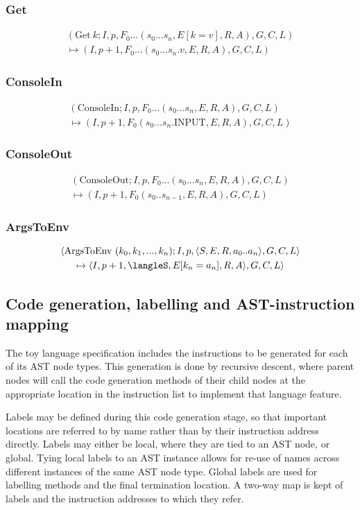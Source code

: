 \subsubsection{Get}
\begin{multline}
(\text{Get}\ k; I, p, F_0...(s_0...s_n, E[k=v], R, A), G, C, L) \\ \mapsto (I, p+1, F_0...(s_0...s_n.v, E, R, A), G, C, L)
\end{multline}
\subsubsection{ConsoleIn}
\begin{multline}
(\text{ConsoleIn}; I, p, F_0...(s_0...s_n, E, R, A), G, C, L) \\ \mapsto (I, p+1, F_0(s_0...s_n.\text{INPUT}, E, R, A), G, C, L)
\end{multline}
\subsubsection{ConsoleOut}
\begin{multline}
(\text{ConsoleOut}; I, p, F_0...(s_0...s_n, E, R, A), G, C, L) \\ \mapsto (I, p+1, F_0(s_0..s_{n-1}, E, R, A), G, C, L)
\end{multline}
\subsubsection{ArgsToEnv}
\begin{multline}
\langle \text{ArgsToEnv}\ (k_0, k_1, ..., k_n); I, p, \langle S, E, R, a_0..a_n \rangle, G, C, L \rangle \\ \mapsto \langle I, p+1, \langleS, E[k_n = a_n], R, A\rangle, G, C, L \rangle
\end{multline}
\subsection{Code generation, labelling and AST-instruction mapping}

The toy language specification includes the instructions to be generated for each of its AST node types. This generation is done by recursive descent, where parent nodes will call the code generation methods of their child nodes at the appropriate location in the instruction list to implement that language feature.

Labels may be defined during this code generation stage, so that important locations are referred to by name rather than by their instruction address directly. Labels may either be local, where they are tied to an AST node, or global. Tying local labels to an AST instance allows for re-use of names across different instances of the same AST node type. Global labels are used for labelling methods and the final termination location. A two-way map is kept of labels and the instruction addresses to which they refer. 


